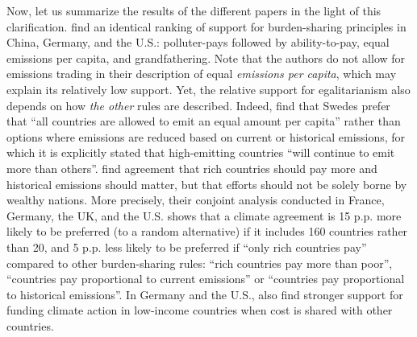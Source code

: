 Now, let us summarize the results of the different papers in the light of this clarification. 
 find an identical ranking of support for burden-sharing principles in China, Germany, and the U.S.: polluter-pays followed by ability-to-pay, equal emissions per capita, and grandfathering. 
Note that the authors do not allow for emissions trading in their description of equal \textit{emissions per capita}, which may explain its relatively low support. 
Yet, the relative support for egalitarianism also depends on how \textit{the other} rules are described. Indeed,  find that Swedes prefer that ``all countries are allowed to emit an equal amount per capita'' rather than options where emissions are reduced based on current or historical emissions, for which it is explicitly stated that high-emitting countries ``will continue to emit more than others''. 
 find agreement that rich countries should pay more and historical emissions should matter, but that efforts should not be solely borne by wealthy nations. More precisely, their conjoint analysis conducted in France, Germany, the UK, and the U.S. shows that a climate agreement is 15 p.p. more likely to be preferred  (to a random alternative) if it includes 160 countries rather than 20, and 5 p.p. less likely to be preferred if ``only rich countries pay'' compared to other burden-sharing rules: ``rich countries pay more than poor'', ``countries pay proportional to current emissions'' or ``countries pay proportional to historical emissions''. In Germany and the U.S.,  also find stronger support for funding climate action in low-income countries when cost is shared with other countries. %

